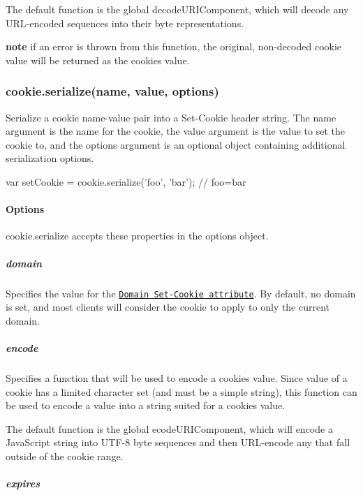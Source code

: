 The default function is the global {\ttfamily decode\+U\+R\+I\+Component}, which will decode any U\+R\+L-\/encoded sequences into their byte representations.

{\bfseries note} if an error is thrown from this function, the original, non-\/decoded cookie value will be returned as the cookie\textquotesingle{}s value.

\subsubsection*{cookie.\+serialize(name, value, options)}

Serialize a cookie name-\/value pair into a {\ttfamily Set-\/\+Cookie} header string. The {\ttfamily name} argument is the name for the cookie, the {\ttfamily value} argument is the value to set the cookie to, and the {\ttfamily options} argument is an optional object containing additional serialization options.


\begin{DoxyCode}
var setCookie = cookie.serialize('foo', 'bar');
// foo=bar
\end{DoxyCode}


\paragraph*{Options}

{\ttfamily cookie.\+serialize} accepts these properties in the options object.

\subparagraph*{domain}

Specifies the value for the \href{https://tools.ietf.org/html/rfc6266#section-5.2.3}{\tt {\ttfamily Domain} {\ttfamily Set-\/\+Cookie} attribute}. By default, no domain is set, and most clients will consider the cookie to apply to only the current domain.

\subparagraph*{encode}

Specifies a function that will be used to encode a cookie\textquotesingle{}s value. Since value of a cookie has a limited character set (and must be a simple string), this function can be used to encode a value into a string suited for a cookie\textquotesingle{}s value.

The default function is the global {\ttfamily ecode\+U\+R\+I\+Component}, which will encode a Java\+Script string into U\+T\+F-\/8 byte sequences and then U\+R\+L-\/encode any that fall outside of the cookie range.

\subparagraph*{expires}

